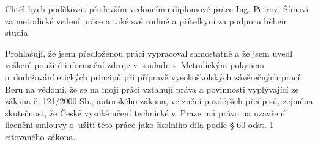 \documentclass[czech,master,unicode,oneside]{ctufit-thesis}
\theoremstyle{plain}
\theoremstyle{definition}
\theoremstyle{remark}
\numberwithin{theorem}{chapter}
\begin{document}
 
\frontmatter\frontmatterinit %


\thispagestyle{empty}\cleardoublepage\maketitle %

\imprintpage %

\tableofcontents %
\listoffigures %
\begingroup
\let\clearpage\relax
\listoftables %
 \listoflistings %
\endgroup

\begin{acknowledgmentpage}
	Chtěl bych poděkovat především vedoucímu diplomové práce Ing. Petrovi Šímovi za metodické vedení práce a také své rodině a přítelkyni za podporu během studia.
\end{acknowledgmentpage} 


\begin{declarationpage}
    Prohlašuji, že jsem předloženou práci vypracoval samostatně a že jsem uvedl veškeré použité
    informační zdroje v~souladu s~Metodickým pokynem o~dodržování etických principů při přípravě
    vysokoškolských závěrečných prací.
    Beru na vědomí, že se na moji práci vztahují práva a povinnosti vyplývající ze zákona č. 121/2000 Sb.,
    autorského zákona, ve znění pozdějších předpisů, zejména skutečnost, že České vysoké učení
    technické v~Praze má právo na uzavření licenční smlouvy o~užití této práce jako školního díla podle §
    60 odst. 1 citovaného zákona.
\end{declarationpage}
\end{document}
